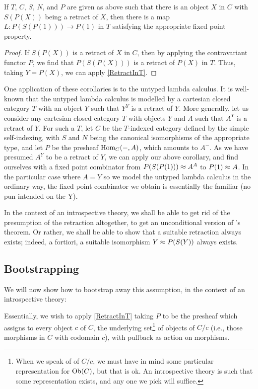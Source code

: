 \begin{corollary}\label{RetractInC}
If $T$, $C$, $S$, $N$, and $P$ are given as above such that there is an object $X$ in $C$ with $S(P(X))$ being a retract of $X$, then there is a map $L : P(S(P(1))) \to P(1)$ in $T$ satisfying the appropriate fixed point property.
\end{corollary}
\begin{proof}
If $S(P(X))$ is a retract of $X$ in $C$, then by applying the contravariant functor $P$, we find that $P(S(P(X)))$ is a retract of $P(X)$ in $T$. Thus, taking $Y = P(X)$, we can apply \cref{RetractInT}.
\end{proof}

One application of these corollaries is to the untyped lambda calculus. It is well-known that the untyped lambda calculus is modelled by a cartesian closed category $T$ with an object $Y$ such that $Y^Y$ is a retract of $Y$. More generally, let us consider any cartesian closed category $T$ with objects $Y$ and $A$ such that $A^Y$ is a retract of $Y$. For such a $T$, let $C$ be the $T$-indexed category defined by the simple self-indexing, with $S$ and $N$ being the canonical isomorphisms of the appropriate type, and let $P$ be the presheaf $\operatorname{Hom}_C(-, A)$, which amounts to $A^{-}$. As we have presumed $A^Y$ to be a retract of $Y$, we can apply our above corollary, and find ourselves with a fixed point combinator from $P(S(P(1))) \approx A^A$ to $P(1) \approx A$. In the particular case where $A = Y$ so we model the untyped lambda calculus in the ordinary way, the fixed point combinator we obtain is essentially the familiar  (no pun intended on the Y).

In the context of an introspective theory, we shall be able to get rid of the presumption of the retraction altogether, to get an unconditional version of \Loeb's theorem. Or rather, we shall be able to show that a suitable retraction always exists; indeed, a fortiori, a suitable isomorphism $Y \approx P(S(Y))$ always exists.

\subsection{Bootstrapping}
We will now show how to bootstrap away this assumption, in the context of an introspective theory:

Essentially, we wish to apply \cref{RetractInT} taking $P$ to be the presheaf which assigns to every object $c$ of $C$, the underlying set\footnote{When we speak of  of $C/c$, we must have in mind some particular representation for $\operatorname{Ob}(C)$, but that is ok. An introspective theory is such that some representation exists, and any one we pick will suffice.} of objects of $C/c$ (i.e., those morphisms in $C$ with codomain $c$), with pullback as action on morphisms.


